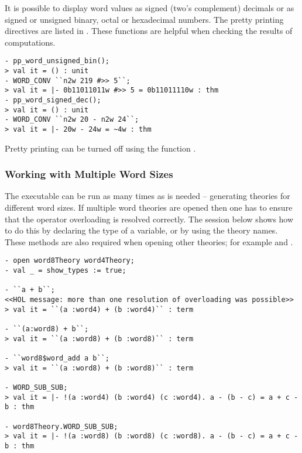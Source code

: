 {
It is possible to display word values as signed (two's complement)
decimals or as signed or unsigned binary, octal or hexadecimal
numbers.  The pretty printing directives are listed in \REFERENCE.
These functions are helpful when checking the results of computations.
\begin{session}
\begin{verbatim}
- pp_word_unsigned_bin();
> val it = () : unit
- WORD_CONV ``n2w 219 #>> 5``;
> val it = |- 0b11011011w #>> 5 = 0b11011110w : thm
- pp_word_signed_dec();
> val it = () : unit
- WORD_CONV ``n2w 20 - n2w 24``;
> val it = |- 20w - 24w = ~4w : thm
\end{verbatim}
\end{session}

\noindent Pretty printing can be turned off using the function .

\subsubsection{Working with Multiple Word Sizes} \label{multiple}

The executable  can be run as many times as is needed
-- generating theories for different word sizes.  If multiple word
theories are opened then one has to ensure that the operator
overloading is resolved correctly.  The session below shows how to do
this by declaring the type of a variable, or by using the theory
names.  These methods are also required when opening other theories;
for example  and .

\setcounter{sessioncount}{0}
\begin{session}
\begin{verbatim}
- open word8Theory word4Theory;
- val _ = show_types := true;

- ``a + b``;
<<HOL message: more than one resolution of overloading was possible>>
> val it = ``(a :word4) + (b :word4)`` : term

- ``(a:word8) + b``;
> val it = ``(a :word8) + (b :word8)`` : term

- ``word8$word_add a b``;
> val it = ``(a :word8) + (b :word8)`` : term

- WORD_SUB_SUB;
> val it = |- !(a :word4) (b :word4) (c :word4). a - (b - c) = a + c - b : thm

- word8Theory.WORD_SUB_SUB;
> val it = |- !(a :word8) (b :word8) (c :word8). a - (b - c) = a + c - b : thm
\end{verbatim}
\end{session}

}
